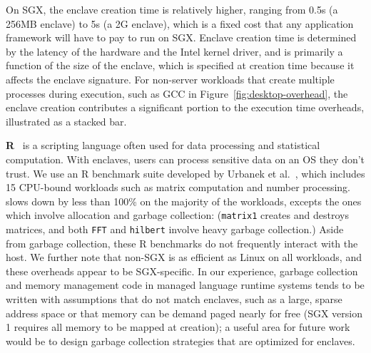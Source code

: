 On SGX, the enclave creation time is relatively higher,  ranging from 0.5s (a 256MB enclave) to 5s (a 2G enclave), which is a fixed cost that any application framework
will have to pay to run on SGX.
Enclave creation time is determined by the latency of the hardware and the Intel kernel driver, and is primarily a function of the size of 
the enclave, which is specified at creation time because it affects the enclave signature. %
For non-server workloads that create multiple processes during execution,
such as GCC in Figure~\ref{fig:desktop-overhead},
the enclave creation contributes a significant portion to the execution time overheads, illustrated as a stacked bar.

{\bf R}~\cite{r-project} is a scripting language often used for
data processing and statistical computation.
With enclaves, users can process sensitive data on an
OS they don't trust.
We use an R benchmark suite developed by Urbanek et al.~\cite{r-benchmark-25}, which includes 15 CPU-bound workloads such as matrix computation and number processing.
\graphenesgx{} slows down by less than 100\% on the majority of the workloads, excepts the ones which involve allocation and garbage collection: ({\tt matrix1} creates and destroys matrices, and both {\tt FFT} and {\tt hilbert} involve heavy garbage collection.)
Aside from garbage collection, these R benchmarks do not frequently interact with the host.
We further note that non-SGX \graphene{} is as efficient as Linux on all workloads, 
and these overheads appear to be SGX-specific.
In our experience, garbage collection and memory management code in managed language runtime
systems tends to be written with assumptions that do not match enclaves,
such as a large, sparse address space or that memory can be demand paged 
nearly for free (SGX version 1 requires all memory to be mapped
at creation); a useful area for future work would be to design
garbage collection strategies that are optimized for enclaves.


